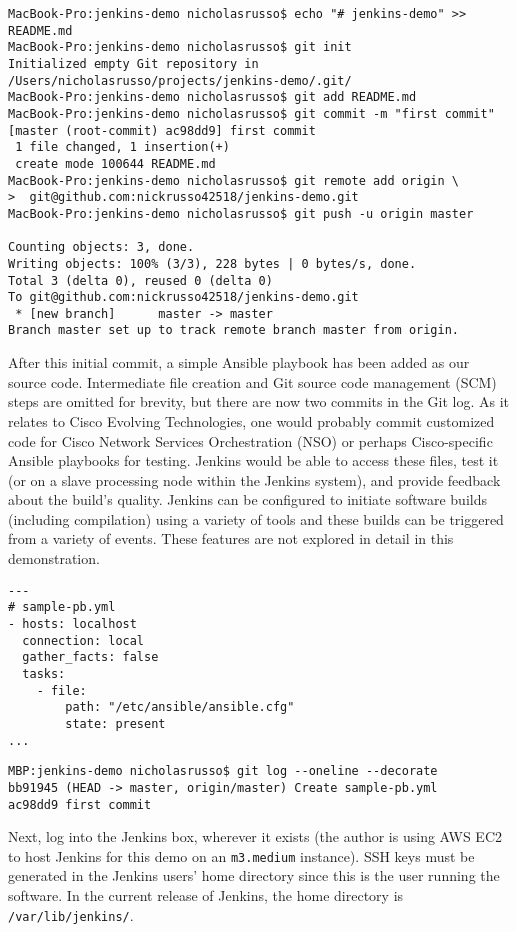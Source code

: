 \begin{verbatim}
MacBook-Pro:jenkins-demo nicholasrusso$ echo "# jenkins-demo" >> README.md
MacBook-Pro:jenkins-demo nicholasrusso$ git init
Initialized empty Git repository in /Users/nicholasrusso/projects/jenkins-demo/.git/
MacBook-Pro:jenkins-demo nicholasrusso$ git add README.md
MacBook-Pro:jenkins-demo nicholasrusso$ git commit -m "first commit"
[master (root-commit) ac98dd9] first commit
 1 file changed, 1 insertion(+)
 create mode 100644 README.md
MacBook-Pro:jenkins-demo nicholasrusso$ git remote add origin \
>  git@github.com:nickrusso42518/jenkins-demo.git
MacBook-Pro:jenkins-demo nicholasrusso$ git push -u origin master

Counting objects: 3, done.
Writing objects: 100% (3/3), 228 bytes | 0 bytes/s, done.
Total 3 (delta 0), reused 0 (delta 0)
To git@github.com:nickrusso42518/jenkins-demo.git
 * [new branch]      master -> master
Branch master set up to track remote branch master from origin.
\end{verbatim}

After this initial commit, a simple Ansible playbook has been added as our
source code. Intermediate file creation and Git source code management (SCM)
steps are omitted for brevity, but there are now two commits in the Git log.
As it relates to Cisco Evolving Technologies, one would probably commit
customized code for Cisco Network Services Orchestration (NSO) or perhaps
Cisco-specific Ansible playbooks for testing. Jenkins would be able to access
these files, test it (or on a slave processing node within the Jenkins
system), and provide feedback about the build's quality. Jenkins can be
configured to initiate software builds (including compilation) using a variety
of tools and these builds can be triggered from a variety of events. These
features are not explored in detail in this demonstration.

\begin{verbatim}
---
# sample-pb.yml
- hosts: localhost
  connection: local
  gather_facts: false
  tasks:
    - file:
        path: "/etc/ansible/ansible.cfg"
        state: present
...
\end{verbatim}

\begin{verbatim}
MBP:jenkins-demo nicholasrusso$ git log --oneline --decorate
bb91945 (HEAD -> master, origin/master) Create sample-pb.yml
ac98dd9 first commit
\end{verbatim}

Next, log into the Jenkins box, wherever it exists (the author is using AWS
EC2 to host Jenkins for this demo on an \verb|m3.medium| instance). SSH keys
must be generated in the Jenkins users' home directory since this is the user
running the software. In the current release of Jenkins, the home directory is
\verb|/var/lib/jenkins/|.

